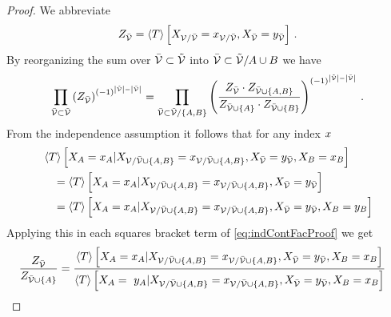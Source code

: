\begin{proof}
	We abbreviate
		\[ Z_{\bar{\mathcal{V}}} = \left\langle T\right\rangle \left[ X_{\mathcal{V}/\bar{\mathcal{V}}}=x_{\mathcal{V}/\bar{\mathcal{V}}}, X_{\bar{\mathcal{V}}} = y_{\bar{\mathcal{V}}} \right] \, . 
 \]
	By reorganizing the sum over $\bar{\mathcal{V}}\subset\tilde{\mathcal{V}}$ into  $\bar{\mathcal{V}}\subset\tilde{\mathcal{V}}/A\cup B$ we have
	\begin{align}\label{eq:indContFacProof}
	 	\prod_{\bar{\mathcal{V}}\subset\tilde{\mathcal{V}}} 
		\left(
			Z_{\bar{\mathcal{V}}}
		\right)^{(-1)^{\left|\tilde{\mathcal{V}}\right|-\left|\bar{\mathcal{V}}\right|}} = 
		 \prod_{\bar{\mathcal{V}}\subset\tilde{\mathcal{V}}/\{A,B\}} 
		 \left( 
		 	\frac{
				Z_{\bar{\mathcal{V}}} \cdot Z_{\bar{\mathcal{V}}\cup\{A,B\}}
			}{
				Z_{\bar{\mathcal{V}}\cup\{A\}} \cdot Z_{\bar{\mathcal{V}}\cup\{B\}}
			}
		 \right)^{(-1)^{\left|\tilde{\mathcal{V}}\right|-\left|\bar{\mathcal{V}}\right|}} \, . 
	\end{align}
	From the independence assumption it follows that for any index $x$
	\begin{align*}
		& \left\langle T\right\rangle \left[ 
			 	X_{A}=x_{A} 
			  | X_{\mathcal{V}/\bar{\mathcal{V}}\cup\{A,B\}}=x_{\mathcal{V}/\bar{\mathcal{V}}\cup\{A,B\}},X_{\bar{\mathcal{V}}}=y_{\bar{\mathcal{V}}},  X_{B}=x_{B}  \right] 
			 \\
		& \quad =  
		\left\langle T\right\rangle \left[ 
			 	X_{A}=x_{A} 
			  | X_{\mathcal{V}/\bar{\mathcal{V}}\cup\{A,B\}}=x_{\mathcal{V}/\bar{\mathcal{V}}\cup\{A,B\}}, X_{\bar{\mathcal{V}}}=y_{\bar{\mathcal{V}}} \right] \\
		 & \quad  = 
		\left\langle T\right\rangle \left[ 
			 	X_{A}=x_{A} 
			  | X_{\mathcal{V}/\bar{\mathcal{V}}\cup\{A,B\}}=x_{\mathcal{V}/\bar{\mathcal{V}}\cup\{A,B\}},X_{\bar{\mathcal{V}}}=y_{\bar{\mathcal{V}}},  X_{B} = y_{B} \right] 
	\end{align*}
	Applying this in each squares bracket term of \eqref{eq:indContFacProof} we get
	\begin{align*}
		\frac{
			Z_{\thirdnodes}
		}{
			Z_{\thirdnodes\cup\{\nodesa\}}
		} 
		& = 
		\frac{
			 \sbnormationofwrt{\hypercore}{
			 	\indexedcatvariableof{\nodesa} 
			 }{\indexedcatvariableof{\nodes/\thirdnodes\cup\{\nodesa,\nodesb\}}, \catvariableof{\thirdnodes}=\seccatindexof{\thirdnodes}, \indexedcatvariableof{\nodesb} } 
		}{
			 \sbnormationofwrt{\hypercore}{
			 	\catvariableof{\nodesa} = \seccatindexof{\nodesa}
			 }{\indexedcatvariableof{\nodes/\thirdnodes\cup\{\nodesa,\nodesb\}} , \catvariableof{\thirdnodes}=\seccatindexof{\thirdnodes}, \indexedcatvariableof{\nodesb}} 
}
\end{align*}
\end{proof}

